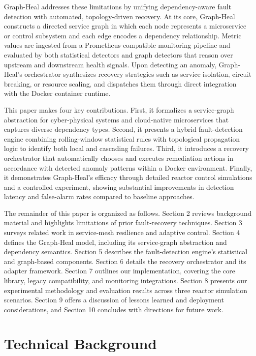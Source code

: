 \documentclass[11pt,conference]{IEEEtran}
\begin{document}
Graph-Heal addresses these limitations by unifying dependency-aware fault detection with automated, topology-driven recovery. At its core, Graph-Heal constructs a directed service graph in which each node represents a microservice or control subsystem and each edge encodes a dependency relationship. Metric values are ingested from a Prometheus-compatible monitoring pipeline and evaluated by both statistical detectors and graph detectors that reason over upstream and downstream health signals. Upon detecting an anomaly, Graph-Heal's orchestrator synthesizes recovery strategies such as service isolation, circuit breaking, or resource scaling, and dispatches them through direct integration with the Docker container runtime.

This paper makes four key contributions. First, it formalizes a service-graph abstraction for cyber-physical systems and cloud-native microservices that captures diverse dependency types. Second, it presents a hybrid fault-detection engine combining rolling-window statistical rules with topological propagation logic to identify both local and cascading failures. Third, it introduces a recovery orchestrator that automatically chooses and executes remediation actions in accordance with detected anomaly patterns within a Docker environment. Finally, it demonstrates Graph-Heal's efficacy through detailed reactor control simulations and a controlled experiment, showing substantial improvements in detection latency and false-alarm rates compared to baseline approaches.

The remainder of this paper is organized as follows. Section 2 reviews background material and highlights limitations of prior fault-recovery techniques. Section 3 surveys related work in service-mesh resilience and adaptive control. Section 4 defines the Graph-Heal model, including its service-graph abstraction and dependency semantics. Section 5 describes the fault-detection engine's statistical and graph-based components. Section 6 details the recovery orchestrator and its adapter framework. Section 7 outlines our implementation, covering the core library, legacy compatibility, and monitoring integrations. Section 8 presents our experimental methodology and evaluation results across three reactor simulation scenarios. Section 9 offers a discussion of lessons learned and deployment considerations, and Section 10 concludes with directions for future work.

\section{Technical Background}
\end{document}
